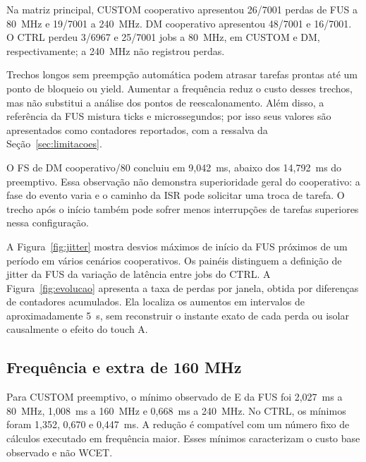 Na matriz principal, CUSTOM cooperativo apresentou 26/7001 perdas de FUS a 80~MHz e 19/7001 a 240~MHz. DM cooperativo apresentou 48/7001 e 16/7001. O CTRL perdeu 3/6967 e 25/7001 jobs a 80~MHz, em CUSTOM e DM, respectivamente; a 240~MHz não registrou perdas.

Trechos longos sem preempção automática podem atrasar tarefas prontas até um ponto de bloqueio ou yield. Aumentar a frequência reduz o custo desses trechos, mas não substitui a análise dos pontos de reescalonamento. Além disso, a referência da FUS mistura ticks e microssegundos; por isso seus valores são apresentados como contadores reportados, com a ressalva da Seção~\ref{sec:limitacoes}.

O FS de DM cooperativo/80 concluiu em 9,042~ms, abaixo dos 14,792~ms do preemptivo. Essa observação não demonstra superioridade geral do cooperativo: a fase do evento varia e o caminho da ISR pode solicitar uma troca de tarefa. O trecho após o início também pode sofrer menos interrupções de tarefas superiores nessa configuração.

A Figura~\ref{fig:jitter} mostra desvios máximos de início da FUS próximos de um período em vários cenários cooperativos. Os painéis distinguem a definição de jitter da FUS da variação de latência entre jobs do CTRL. A Figura~\ref{fig:evolucao} apresenta a taxa de perdas por janela, obtida por diferenças de contadores acumulados. Ela localiza os aumentos em intervalos de aproximadamente 5~s, sem reconstruir o instante exato de cada perda ou isolar causalmente o efeito do touch A.


\subsection{Frequência e extra de 160 MHz}

Para CUSTOM preemptivo, o mínimo observado de E da FUS foi 2,027~ms a 80~MHz, 1,008~ms a 160~MHz e 0,668~ms a 240~MHz. No CTRL, os mínimos foram 1,352, 0,670 e 0,447~ms. A redução é compatível com um número fixo de cálculos executado em frequência maior. Esses mínimos caracterizam o custo base observado e não WCET.

